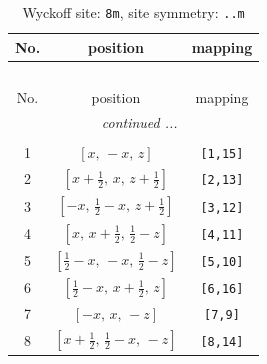\documentclass[fleqn,8pt]{jsarticle}
\begin{document}
\begin{longtable}{ccc}
\caption{Wyckoff site: {\tt 8m}, site symmetry: {\tt ..m}}
 \\
 \hline \hline
No. & position & mapping \\ \hline \endfirsthead

\multicolumn{2}{l}{\tablename\ \thetable{}} \\
 \hline \hline
No. & position & mapping \\ \hline \endhead

 \hline \hline
\multicolumn{2}{r}{\footnotesize\it continued ...} \\ \endfoot

 \hline \hline
\multicolumn{2}{r}{} \\ \endlastfoot

1 & $\left[ x,\, - x,\, z \right]$ & {\tt [1,15]} \\ \hline
2 & $\left[ x + \frac{1}{2},\, x,\, z + \frac{1}{2} \right]$ & {\tt [2,13]} \\ \hline
3 & $\left[ - x,\, \frac{1}{2} - x,\, z + \frac{1}{2} \right]$ & {\tt [3,12]} \\ \hline
4 & $\left[ x,\, x + \frac{1}{2},\, \frac{1}{2} - z \right]$ & {\tt [4,11]} \\ \hline
5 & $\left[ \frac{1}{2} - x,\, - x,\, \frac{1}{2} - z \right]$ & {\tt [5,10]} \\ \hline
6 & $\left[ \frac{1}{2} - x,\, x + \frac{1}{2},\, z \right]$ & {\tt [6,16]} \\ \hline
7 & $\left[ - x,\, x,\, - z \right]$ & {\tt [7,9]} \\ \hline
8 & $\left[ x + \frac{1}{2},\, \frac{1}{2} - x,\, - z \right]$ & {\tt [8,14]} \\
\end{longtable}
\renewcommand{\arraystretch}{1.2}
\end{document}
